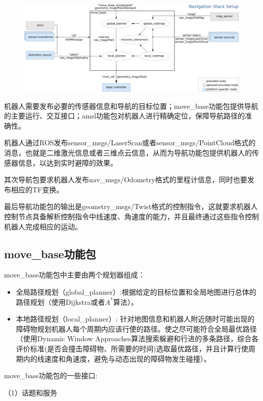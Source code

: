 \documentclass[9pt, oneside]{book}
\begin{document}
\begin{figure}[H]
    \centering
    \includegraphics[width=1.0\linewidth]{image/导航功能包框架.png}
\end{figure}

机器人需要发布必要的传感器信息和导航的目标位置；move\_base功能包提供导航的主要运行、交互接口；amsl功能包对机器人进行精确定位，保障导航路径的准确性。

机器人通过ROS发布sensor\_msgs/LaserScan或者sensor\_msgs/PointCloud格式的消息，也就是二维激光信息或者三维点云信息，从而为导航功能包提供机器人的传感器信息，以达到实时避障的效果。

其次导航包要求机器人发布nav\_msgs/Odometry格式的里程计信息，同时也要发布相应的TF变换。

最后导航功能包的输出是geometry\_msgs/Twist格式的控制指令，这就要求机器人控制节点具备解析控制指令中线速度、角速度的能力，并且最终通过这些指令控制机器人完成相应的运动。

\subsection{move\_base功能包}

move\_base功能包中主要由两个规划器组成：

\begin{itemize}
    \item 全局路径规划（global\_planner）:根据给定的目标位置和全局地图进行总体的路径规划（使用Dijkstra或者$A^{*}$算法）。
    \item 本地路径规划（local\_planner）: 针对地图信息和机器人附近随时可能出现的障碍物规划机器人每个周期内应该行使的路径。使之尽可能符合全局最优路径（使用Dynamic Window Approaches算法搜索躲避和行进的多条路径，综合各评价标准(是否会撞击障碍物、所需要的时间)选取最优路径，并且计算行使周期内的线速度和角速度，避免与动态出现的障碍物发生碰撞）。
\end{itemize}

move\_base功能包的一些接口:

（1）话题和服务
\end{document}
